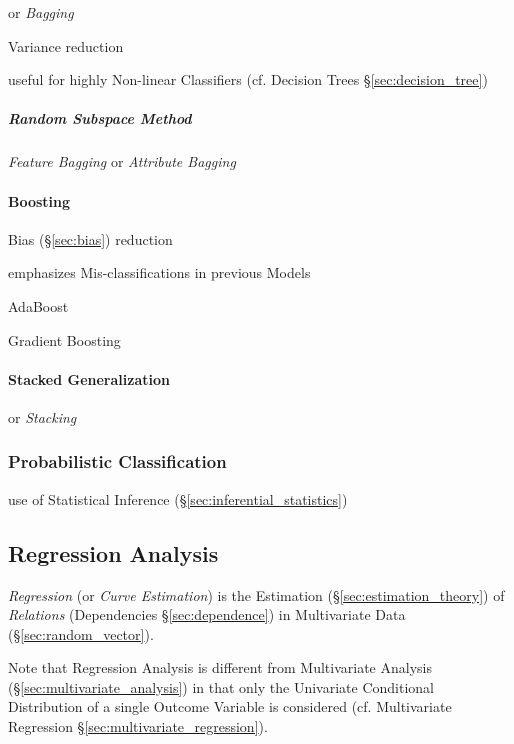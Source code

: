 or \emph{Bagging}

Variance reduction

useful for highly Non-linear Classifiers (cf. Decision Trees
\S\ref{sec:decision_tree})



\subparagraph{Random Subspace Method}\label{sec:random_subspace_method}\hfill

\emph{Feature Bagging} or \emph{Attribute Bagging}



\paragraph{Boosting}\label{sec:boosting}\hfill

Bias (\S\ref{sec:bias}) reduction

emphasizes Mis-classifications in previous Models

AdaBoost

Gradient Boosting



\paragraph{Stacked Generalization}\label{sec:stacked_generalization}\hfill

or \emph{Stacking}



\subsubsection{Probabilistic Classification}
\label{sec:probabilistic_classification}

use of Statistical Inference (\S\ref{sec:inferential_statistics})



\subsection{Regression Analysis}\label{sec:regression_analysis}

\emph{Regression} (or \emph{Curve Estimation}) is the Estimation
(\S\ref{sec:estimation_theory}) of \emph{Relations} (Dependencies
\S\ref{sec:dependence}) in Multivariate Data (\S\ref{sec:random_vector}).

Note that Regression Analysis is different from Multivariate Analysis
(\S\ref{sec:multivariate_analysis}) in that only the Univariate Conditional
Distribution of a single Outcome Variable is considered (cf. Multivariate
Regression \S\ref{sec:multivariate_regression}).

